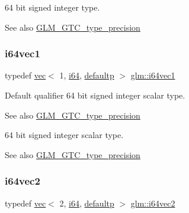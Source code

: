64 bit signed integer type. \begin{DoxySeeAlso}{See also}
\mbox{\hyperlink{group__gtc__type__precision}{G\+L\+M\+\_\+\+G\+T\+C\+\_\+type\+\_\+precision}} 
\end{DoxySeeAlso}
\mbox{\label{group__gtc__type__precision_gad2bbfb4ed2d4b1e1551c721f81739e49}} 
\subsubsection{\texorpdfstring{i64vec1}{i64vec1}}
{\footnotesize\ttfamily typedef \mbox{\hyperlink{structglm_1_1vec}{vec}}$<$ 1, \mbox{\hyperlink{group__gtc__type__precision_gac7a7eaad46064fc952b06df33689da23}{i64}}, \mbox{\hyperlink{namespaceglm_a36ed105b07c7746804d7fdc7cc90ff25a9d21ccd8b5a009ec7eb7677befc3bf51}{defaultp}} $>$ \mbox{\hyperlink{group__gtc__type__precision_gad2bbfb4ed2d4b1e1551c721f81739e49}{glm\+::i64vec1}}}

Default qualifier 64 bit signed integer scalar type. \begin{DoxySeeAlso}{See also}
\mbox{\hyperlink{group__gtc__type__precision}{G\+L\+M\+\_\+\+G\+T\+C\+\_\+type\+\_\+precision}}
\end{DoxySeeAlso}
64 bit signed integer scalar type. \begin{DoxySeeAlso}{See also}
\mbox{\hyperlink{group__gtc__type__precision}{G\+L\+M\+\_\+\+G\+T\+C\+\_\+type\+\_\+precision}} 
\end{DoxySeeAlso}
\mbox{\label{group__gtc__type__precision_ga8654a1b3a6f81677f53eec13f8dd4224}} 
\subsubsection{\texorpdfstring{i64vec2}{i64vec2}}
{\footnotesize\ttfamily typedef \mbox{\hyperlink{structglm_1_1vec}{vec}}$<$ 2, \mbox{\hyperlink{group__gtc__type__precision_gac7a7eaad46064fc952b06df33689da23}{i64}}, \mbox{\hyperlink{namespaceglm_a36ed105b07c7746804d7fdc7cc90ff25a9d21ccd8b5a009ec7eb7677befc3bf51}{defaultp}} $>$ \mbox{\hyperlink{group__gtc__type__precision_ga8654a1b3a6f81677f53eec13f8dd4224}{glm\+::i64vec2}}}

